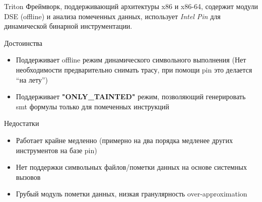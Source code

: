 \documentclass[10pt]{beamer}
\begin{document}
\begin{frame}{Triton}
    Фреймворк, поддерживающий архитектуры x86 и x86-64, содержит модули DSE (offline) и анализа помеченных данных, использует \emph{Intel Pin} для динамической бинарной инструментации.
    \begin{block}{Достоинства}
        \begin{itemize}
        \item Поддерживает offline режим динамического символьного выполнения (Нет необходимости предварительно снимать трасу, при помощи pin это делается ``на лету'')
        \item Поддерживает \textbf{"ONLY\_TAINTED"} режим, позволяющий генерировать smt формулы только для помеченных инструкций
        \end{itemize}
    \end{block}

      \begin{block}{Недостатки}
          \begin{itemize}
      \item Работает крайне медленно (примерно на два порядка медленее других инструментов на базе pin)
      \item Нет поддержки символьных файлов/пометки данных на основе системных вызовов
      \item Грубый модуль пометки данных, низкая гранулярность over-approximation
      \end{itemize}
    \end{block}

\end{frame}

\end{document}
